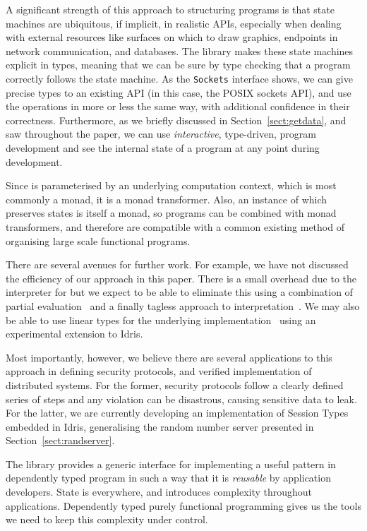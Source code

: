 A significant strength of this approach to structuring 
programs is that state machines are ubiquitous, if implicit, in realistic APIs,
especially when dealing with external resources like surfaces on which to draw
graphics, endpoints in network communication, and databases.  The \states{}
library makes these state machines explicit in types, meaning
that we can be sure by type checking that a program correctly follows the state
machine.  As the \texttt{Sockets} interface shows, we can give precise types to
an existing API (in this case, the POSIX sockets API), and use the operations
in more or less the same way, with additional confidence in their correctness.
%
Furthermore, as we briefly discussed in Section~\ref{sect:getdata}, and 
saw throughout the paper, we can use \emph{interactive}, type-driven, program
development and see the internal state of a program at any point during
development.

Since \states{} is parameterised by an underlying computation context, which is
most commonly a monad, it is a monad transformer.  Also, an instance of
\states{} which preserves states is itself a monad, so \states{} programs can
be combined with monad transformers, and therefore are compatible with a common
existing method of organising large scale functional programs.

There are several avenues for further work.  For example, we have not discussed
the efficiency of our approach in this paper. There is a small overhead due to
the interpreter for \states{} but we expect to be able to eliminate this using
a combination of partial evaluation~\citet{scrap-engine} and a finally tagless
approach to interpretation~\citet{Carette2009}. We may also be able to use
linear types for the underlying implementation~\citet{McBride2016} using an
experimental extension to Idris.

Most importantly, however, we believe there are several applications to
this approach in defining security protocols, and verified implementation
of distributed systems. For the former, security protocols follow a clearly
defined series of steps and any violation can be disastrous, causing
sensitive data to leak.
%
For the latter, we are currently developing an implementation of Session
Types~\citet{Honda93,Honda08} embedded in Idris, generalising the random
number server presented in Section~\ref{sect:randserver}.

The \states{} library provides a generic interface for implementing a useful
pattern in dependently typed program in such a way that it is \emph{reusable}
by application developers. State is everywhere, and introduces complexity
throughout applications. Dependently typed purely functional programming gives
us the tools we need to keep this complexity under control.
